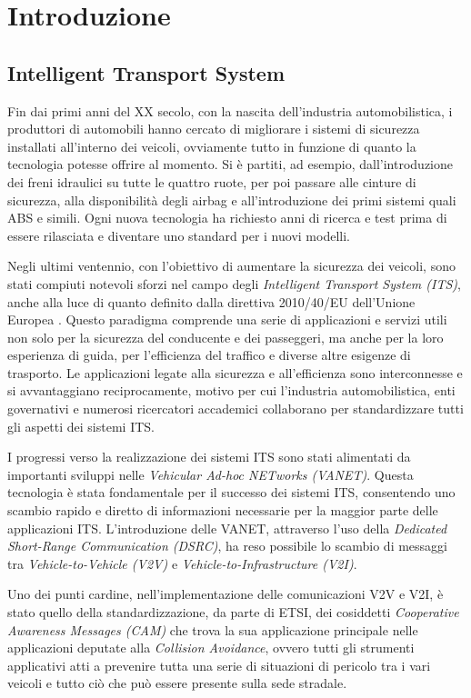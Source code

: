\chapter{Introduzione}

\section{Intelligent Transport System}
Fin dai primi anni del XX secolo, con la nascita dell'industria automobilistica, i produttori di automobili hanno cercato di migliorare i sistemi di sicurezza installati all'interno dei veicoli, ovviamente tutto in funzione di quanto la tecnologia potesse offrire al momento. Si è partiti, ad esempio, dall'introduzione dei freni idraulici su tutte le quattro ruote, per poi passare alle cinture di sicurezza, alla disponibilità degli airbag e all'introduzione dei primi sistemi quali ABS e simili. Ogni nuova tecnologia ha richiesto anni di ricerca e test prima di essere rilasciata e diventare uno standard per i nuovi modelli.

Negli ultimi ventennio, con l'obiettivo di aumentare la sicurezza dei veicoli, sono stati compiuti notevoli sforzi nel campo degli \textit{Intelligent Transport System (ITS)}, anche alla luce di quanto definito dalla direttiva 2010/40/EU dell'Unione Europea \cite{2010-40}. Questo paradigma comprende una serie di applicazioni e servizi utili non solo per la sicurezza del conducente e dei passeggeri, ma anche per la loro esperienza di guida, per l'efficienza del traffico e diverse altre esigenze di trasporto. Le applicazioni legate alla sicurezza e all'efficienza sono interconnesse e si avvantaggiano reciprocamente, motivo per cui l'industria automobilistica, enti governativi e numerosi ricercatori accademici collaborano per standardizzare tutti gli aspetti dei sistemi ITS.

I progressi verso la realizzazione dei sistemi ITS sono stati alimentati da importanti sviluppi nelle \textit{Vehicular Ad-hoc NETworks (VANET)}. Questa tecnologia è stata fondamentale per il successo dei sistemi ITS, consentendo uno scambio rapido e diretto di informazioni necessarie per la maggior parte delle applicazioni ITS. L'introduzione delle VANET, attraverso l'uso della \textit{Dedicated Short-Range Communication (DSRC)}, ha reso possibile lo scambio di messaggi tra \textit{Vehicle-to-Vehicle (V2V)} e \textit{Vehicle-to-Infrastructure (V2I)}.

Uno dei punti cardine, nell'implementazione delle comunicazioni V2V e V2I, è stato quello della standardizzazione, da parte di ETSI, dei cosiddetti \textit{Cooperative Awareness Messages (CAM)} che trova la sua applicazione principale nelle applicazioni deputate alla \textit{Collision Avoidance}, ovvero tutti gli strumenti applicativi atti a prevenire tutta una serie di situazioni di pericolo tra i vari veicoli e tutto ciò che può essere presente sulla sede stradale.

